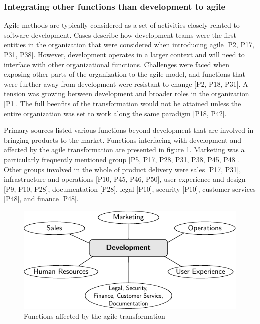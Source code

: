 \documentclass[preprint,authoryear,12pt]{elsarticle}
\begin{document}
\subsubsection{Integrating other functions than development to agile}

Agile methods are typically considered as a set of activities closely related to
software development. Cases describe how development teams were the first
entities in the organization that were considered when introducing agile [P2,
P17, P31, P38]. However, development operates in a larger context and will need
to interface with other organizational functions.
Challenges were faced when exposing other parts of the organization to the agile
model, and functions that were further away from development were resistant to
change [P2, P18, P31]. A tension was growing between development and broader
roles in the organization [P1]. The full beenfits of the transformation would
not be attained unless the entire organization was set to work along the same
paradigm [P18, P42].

Primary sources listed various functions beyond development that are involved in
bringing products to the market. Functions interfacing with development and
affected by the agile transformation are presented in figure
\ref{fig:challenges_other_functions}.
Marketing was a particularly frequently mentioned group [P5, P17, P28, P31, P38,
P45, P48]. Other groups involved in the whole of product delivery were sales
[P17, P31], infrastructure and operations [P10, P45, P46, P50], user experience
and design [P9, P10, P28], documentation [P28], legal [P10], security [P10],
customer services [P48], and finance [P48].

\begin{figure}
  \begin{center}
    \includegraphics{graphics/challenges_other_functions.pdf}
    \caption{Functions affected by the agile transformation}
    \label{fig:challenges_other_functions}
  \end{center}
\end{figure}
\end{document}
